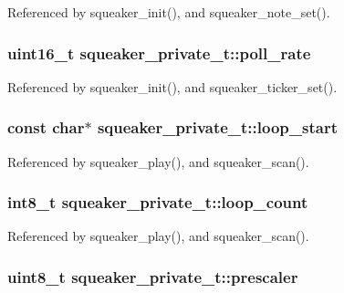 Referenced by squeaker\_\-init(), and squeaker\_\-note\_\-set().\hypertarget{structsqueaker__private__t_4c251844d783d1683e0838c058488255}{
\subsubsection{\setlength{\rightskip}{0pt plus 5cm}uint16\_\-t {\bf squeaker\_\-private\_\-t::poll\_\-rate}}}
\label{structsqueaker__private__t_4c251844d783d1683e0838c058488255}




Referenced by squeaker\_\-init(), and squeaker\_\-ticker\_\-set().\hypertarget{structsqueaker__private__t_ae7ca730e1ef15f14016aacbad39152a}{
\subsubsection{\setlength{\rightskip}{0pt plus 5cm}const char$\ast$ {\bf squeaker\_\-private\_\-t::loop\_\-start}}}
\label{structsqueaker__private__t_ae7ca730e1ef15f14016aacbad39152a}




Referenced by squeaker\_\-play(), and squeaker\_\-scan().\hypertarget{structsqueaker__private__t_6a199edcabf647fed91b5d1fffc209d1}{
\subsubsection{\setlength{\rightskip}{0pt plus 5cm}int8\_\-t {\bf squeaker\_\-private\_\-t::loop\_\-count}}}
\label{structsqueaker__private__t_6a199edcabf647fed91b5d1fffc209d1}




Referenced by squeaker\_\-play(), and squeaker\_\-scan().\hypertarget{structsqueaker__private__t_37d737c89bb007a89506a36eaa9dfec3}{
\subsubsection{\setlength{\rightskip}{0pt plus 5cm}uint8\_\-t {\bf squeaker\_\-private\_\-t::prescaler}}}
\label{structsqueaker__private__t_37d737c89bb007a89506a36eaa9dfec3}




